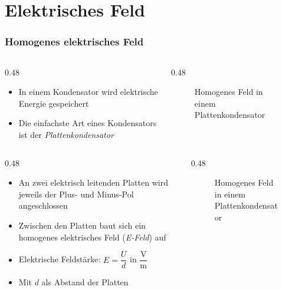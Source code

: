 
\section{Elektrisches Feld}
\label{section:e_feld}
\begin{frame}%

\frametitle{Homogenes elektrisches Feld}
\begin{columns}
    \begin{column}{0.48\textwidth}
    \begin{itemize}
  \item In einem Kondensator wird elektrische Energie gespeichert
  \item Die einfachste Art eines Kondensators ist der \emph{Plattenkondensator}
  \end{itemize}

    \end{column}
   \begin{column}{0.48\textwidth}
       
\begin{figure}
    \caption{\scriptsize Homogenes Feld in einem Plattenkondensator}
    \label{e_kondensator_homogenes_feld}
\end{figure}


   \end{column}
\end{columns}

\end{frame}

\begin{frame}
\begin{columns}
    \begin{column}{0.48\textwidth}
    \begin{itemize}
  \item An zwei elektrisch leitenden Platten wird jeweils der Plus- und Minus-Pol angeschlossen
  \item Zwischen den Platten baut sich ein homogenes elektrisches Feld (\emph{E-Feld}) auf
  \item Elektrische Feldstärke: $E = \dfrac{U}{d}$ in $\dfrac{\unit{\volt}}{\unit{\metre}}$
  \item Mit $d$ als Abstand der Platten
  \end{itemize}

    \end{column}
   \begin{column}{0.48\textwidth}
       
\begin{figure}
    \caption{\scriptsize Homogenes Feld in einem Plattenkondensator}
    \label{e_kondensator_homogenes_feld}
\end{figure}


   \end{column}
\end{columns}

\end{frame}

